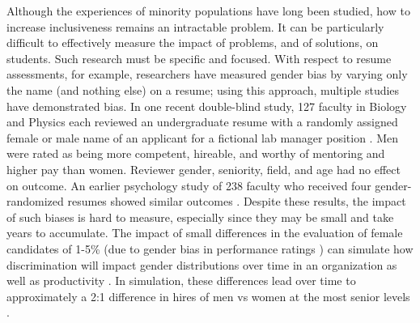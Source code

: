 Although the experiences of minority populations have long been studied, how to increase inclusiveness remains an intractable problem. It can be particularly difficult to effectively measure the impact of problems, and of solutions, on students. Such research must be  specific and focused. %
With respect to resume assessments, for example, researchers have measured gender bias by varying only the name (and nothing else) on a resume; using this approach, multiple studies have demonstrated bias. In one recent double-blind study, 127 faculty in Biology and Physics each reviewed an undergraduate resume with a randomly assigned female or male name of an applicant for a fictional lab manager position \citep{Moss-Racusin:2012}. Men were rated as being more competent, hireable, and worthy of mentoring and higher pay than women. Reviewer gender, seniority, field, and age had no effect on outcome. An earlier psychology study of 238 faculty who received four gender-randomized resumes showed similar outcomes \citep{Steinpreis:1999}. Despite these results, the impact of such biases is hard to measure, especially since they may be small and take years to accumulate. The impact of small differences in the evaluation of female candidates of 1-5\% (due to gender bias in performance ratings \citep{Barrett:1993}) can simulate how discrimination will impact gender distributions over time in an organization \citep{Martell:1996} as well as productivity \citep{Cole:1991}. In simulation, these differences lead over time to approximately a 2:1  difference in hires of men vs women at the most senior levels \citep{Cole:1991,Martell:1996}.  


